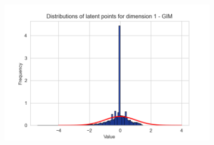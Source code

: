 \begin{figure}[h]
	\centering
	\begin{subfigure}[b]{0.25\textwidth}
		\centering
		\includegraphics[width=1\linewidth]{"graphs/distr/module1 kld0/_ distribution_latent_space_GIM_dim=0"}
		

\end{subfigure}
\end{figure}
